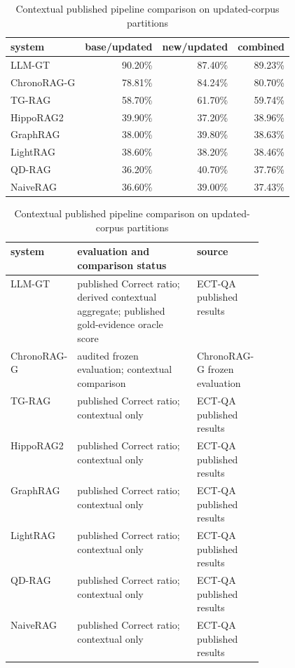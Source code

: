 \begin{table}[htbp]
\centering
\footnotesize
\setlength{\tabcolsep}{3pt}
\caption{Contextual published pipeline comparison on updated-corpus partitions}
\label{tab:d5c-published-pipeline-context}
\begin{tabularx}{\linewidth}{X r r r}
\toprule
system & base/updated & new/updated & combined \\
\midrule
LLM-GT & 90.20\% & 87.40\% & 89.23\% \\
ChronoRAG-G & 78.81\% & 84.24\% & 80.70\% \\
TG-RAG & 58.70\% & 61.70\% & 59.74\% \\
HippoRAG2 & 39.90\% & 37.20\% & 38.96\% \\
GraphRAG & 38.00\% & 39.80\% & 38.63\% \\
LightRAG & 38.60\% & 38.20\% & 38.46\% \\
QD-RAG & 36.20\% & 40.70\% & 37.76\% \\
NaiveRAG & 36.60\% & 39.00\% & 37.43\% \\
\bottomrule
\end{tabularx}
\vspace{0.45em}
\begin{tabularx}{\linewidth}{>{\raggedright\arraybackslash}p{0.17\linewidth}>{\raggedright\arraybackslash}X>{\raggedright\arraybackslash}p{0.25\linewidth}}
\toprule
system & evaluation and comparison status & source \\
\midrule
LLM-GT & published Correct ratio; derived contextual aggregate; published gold-evidence oracle score & ECT-QA published results \\
ChronoRAG-G & audited frozen evaluation; contextual comparison & ChronoRAG-G frozen evaluation \\
TG-RAG & published Correct ratio; contextual only & ECT-QA published results \\
HippoRAG2 & published Correct ratio; contextual only & ECT-QA published results \\
GraphRAG & published Correct ratio; contextual only & ECT-QA published results \\
LightRAG & published Correct ratio; contextual only & ECT-QA published results \\
QD-RAG & published Correct ratio; contextual only & ECT-QA published results \\
NaiveRAG & published Correct ratio; contextual only & ECT-QA published results \\
\bottomrule
\end{tabularx}
\end{table}
